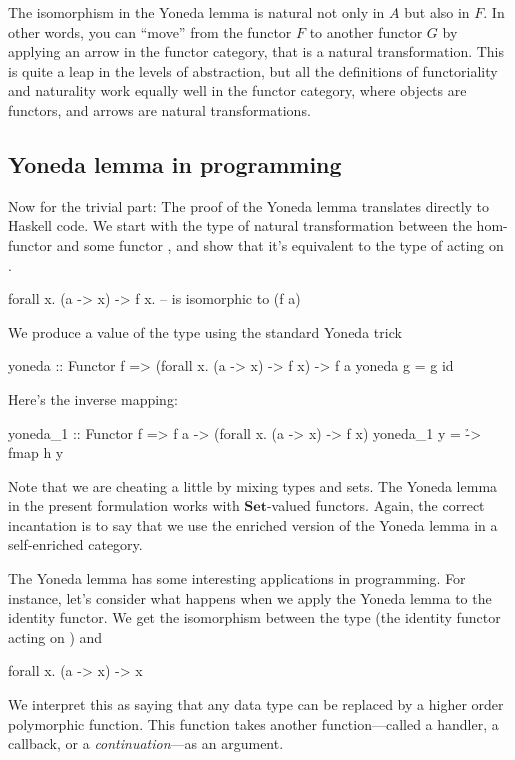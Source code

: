 \documentclass[DaoFP]{subfiles}
\begin{document}
The isomorphism in the Yoneda lemma is natural not only in $A$ but also in $F$. In other words, you can ``move'' from the functor $F$ to another functor $G$ by applying an arrow in the functor category, that is a natural transformation. This is quite a leap in the levels of abstraction, but all the definitions of functoriality and naturality work equally well in the functor category, where objects are functors, and arrows are natural transformations.

\subsection{Yoneda lemma in programming}

Now for the trivial part: The proof of the Yoneda lemma translates directly to Haskell code. We start with the type of natural transformation between the hom-functor  and some functor , and show that it's equivalent to the type of  acting on .
\begin{haskell}
forall x. (a -> x) -> f x.   -- is isomorphic to (f a)
\end{haskell}
We produce a value of the type  using the standard Yoneda trick
\begin{haskell}
yoneda :: Functor f => (forall x. (a -> x) -> f x) -> f a
yoneda g = g id
\end{haskell}
Here's the inverse mapping:
\begin{haskell}
yoneda_1 :: Functor f => f a -> (forall x. (a -> x) -> f x)
yoneda_1 y = \h -> fmap h y
\end{haskell}

Note that we are cheating a little by mixing types and sets. The Yoneda lemma in the present formulation works with  $\mathbf{Set}$-valued functors. Again, the correct incantation is to say that we use the enriched version of the Yoneda lemma in a self-enriched category.

The Yoneda lemma has some interesting applications in programming. For instance, let's consider what happens when we apply the Yoneda lemma to the identity functor. We get the isomorphism between the type  (the identity functor acting on ) and
\begin{haskell}
forall x. (a -> x) -> x
\end{haskell}
We interpret this as saying that any data type  can be replaced by a higher order polymorphic function. This function takes another function---called a handler, a callback, or a \emph{continuation}---as an argument. 
\end{document}
